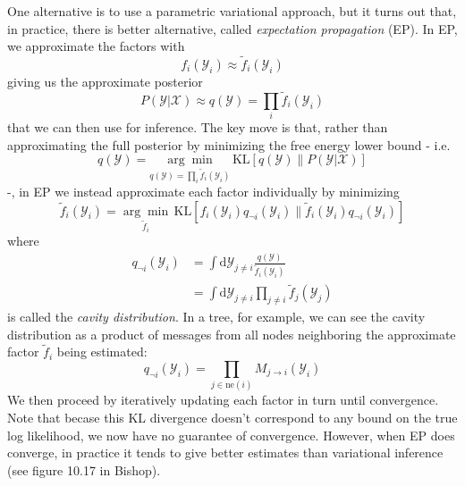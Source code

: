 \documentclass[a4paper]{article}
\begin{document}
One alternative is to use a parametric variational approach, but it turns out that, in practice, there is better alternative, called \emph{expectation propagation} (EP). In EP, we approximate the factors with
\[ f_i(\mathcal{Y}_i) \approx \tilde{f}_i(\mathcal{Y}_i) \]
giving us the approximate posterior
\[ P(\mathcal{Y}|\mathcal{X}) \approx q(\mathcal{Y}) = \prod_i \tilde{f}_i(\mathcal{Y}_i) \]
that we can then use for inference. The key move is that, rather than approximating the full posterior by minimizing the free energy lower bound - i.e.
\[ q(\mathcal{Y}) = \underset{q(\mathcal{Y}) = \prod_i \tilde{f}_i(\mathcal{Y}_i)}{\arg\min}\, \textrm{KL}\left[q(\mathcal{Y}) \| P(\mathcal{Y}|\mathcal{X}) \right] \]
-, in EP we instead approximate each factor individually by minimizing
\[ \tilde{f}_i(\mathcal{Y}_i) = \underset{\tilde{f}_i}{\arg\min}\, \textrm{KL}\left[ f_i(\mathcal{Y}_i)q_{\neg i}(\mathcal{Y}_i) \| \tilde{f}_i(\mathcal{Y}_i)q_{\neg i}(\mathcal{Y}_i) \right] \]
where
\begin{align*}
q_{\neg i}(\mathcal{Y}_i) &= \int \textrm{d}\mathcal{Y}_{j \neq i} \frac{q(\mathcal{Y})}{\tilde{f}_i(\mathcal{Y}_i)} \\
&= \int \textrm{d}\mathcal{Y}_{j \neq i} \prod_{j \neq i}\tilde{f}_j(\mathcal{Y}_j)
\end{align*}
is called the \emph{cavity distribution}. In a tree, for example, we can see the cavity distribution as a product of messages from all nodes neighboring the approximate factor $\tilde{f}_i$ being estimated:
\[ q_{\neg i}(\mathcal{Y}_i) = \prod_{j \in \textrm{ne}(i)} M_{j\rightarrow i}(\mathcal{Y}_i) \]
We then proceed by iteratively updating each factor in turn until convergence. Note that becase this KL divergence doesn't correspond to any bound on the true log likelihood, we now have no guarantee of convergence. However, when EP does converge, in practice it tends to give better estimates than variational inference (see figure 10.17 in Bishop). 
\end{document}
